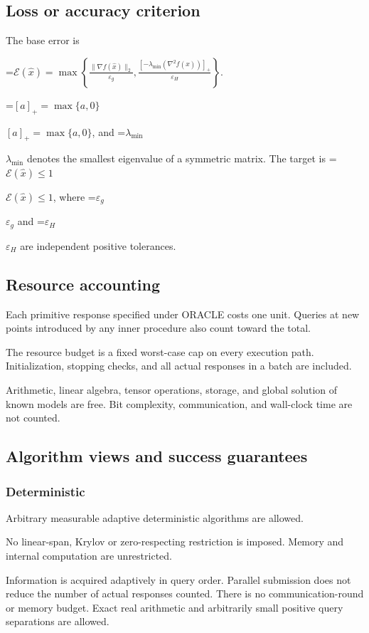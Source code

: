 \documentclass[10pt,a4paper]{article}
\newcommand{\AtlasMath}[1]{\par\begingroup\centering\setbox0=\hbox{$\displaystyle #1$}\ifdim\wd0>1.4\linewidth\typeout{ATLAS WIDE FORMULA: \the\wd0}\fi\ifdim\wd0>\linewidth\resizebox{\linewidth}{!}{\box0}\else\box0\fi\par\endgroup}
\newcommand{\AtlasInlineMath}[1]{\begingroup\setbox0=\hbox{$#1$}\ifdim\wd0>.4\linewidth\endgroup\AtlasMath{#1}\else\endgroup$#1$\fi}
\begin{document}
\subsection{Loss or accuracy criterion}
The base error is


\AtlasMath{\mathcal{E}(\widehat{x})=\max\left\{\frac{\|\nabla f(\widehat{x})\|_2}{\varepsilon_g},\frac{[-\lambda_{\min}(\nabla^2f(\widehat{x}))]_+}{\varepsilon_H}\right\}.}


\AtlasInlineMath{[a]_+=\max\{a,0\}}, and \AtlasInlineMath{\lambda_{\min}} denotes the smallest eigenvalue of a symmetric matrix. The target is \AtlasInlineMath{\mathcal{E}(\widehat{x})\le1}, where \AtlasInlineMath{\varepsilon_g} and \AtlasInlineMath{\varepsilon_H} are independent positive tolerances.

\subsection{Resource accounting}
Each primitive response specified under ORACLE costs one unit. Queries at new points introduced by any inner procedure also count toward the total.

The resource budget is a fixed worst-case cap on every execution path. Initialization, stopping checks, and all actual responses in a batch are included.

Arithmetic, linear algebra, tensor operations, storage, and global solution of known models are free. Bit complexity, communication, and wall-clock time are not counted.

\subsection{Algorithm views and success guarantees}
\subsubsection{Deterministic}
Arbitrary measurable adaptive deterministic algorithms are allowed.

No linear-span, Krylov or zero-respecting restriction is imposed. Memory and internal computation are unrestricted.

Information is acquired adaptively in query order. Parallel submission does not reduce the number of actual responses counted. There is no communication-round or memory budget. Exact real arithmetic and arbitrarily small positive query separations are allowed.
\end{document}

